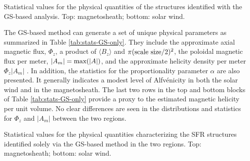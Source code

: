 \begin{table}
    \centering
    \caption[Statistical values for the physical quantities of structures identified with GS-based analysis analysis]{Statistical values for the physical quantities of the structures identified with the GS-based analysis. Top: magnetosheath; bottom: solar wind.}
    
    \label{tab:stats-GS}
\end{table}

The GS-based method can generate a set of unique physical parameters \citep{Hu:2017} as summarized in Table \ref{tab:stats-GS-only}. They include the approximate axial magnetic flux, $\Phi_z$, a product of $\langle B_z\rangle$ and $\pi(\textnormal{scale size}/2)^2$, the poloidal magnetic flux per meter, $|A_m| = \textnormal{max}(|A|)$, and the approximate helicity density per meter $\Phi_z|A_m|$ \citep{Hu:2014}. In addition, the statistics for the proportionality parameter $\alpha$ are also presented. It generally indicates a modest level of Alfv\'enicity in both the solar wind and in the magnetosheath. The last two rows in the top and bottom blocks of Table \ref{tab:stats-GS-only} provide a proxy to the estimated magnetic helicity per unit volume. No clear differences are seen in the distributions and statistics for $\Phi_z$ and $|A_m|$ between the two regions.
\begin{table}[ht!]
    \caption[Statistical values for the physical quantities of SFR structures identified solely via the GS-based method]{Statistical values for the physical quantities characterizing the SFR structures identified solely via the GS-based method in the two regions. Top: magnetosheath; bottom: solar wind.}
    \centering
    
    \label{tab:stats-GS-only}
\end{table}


